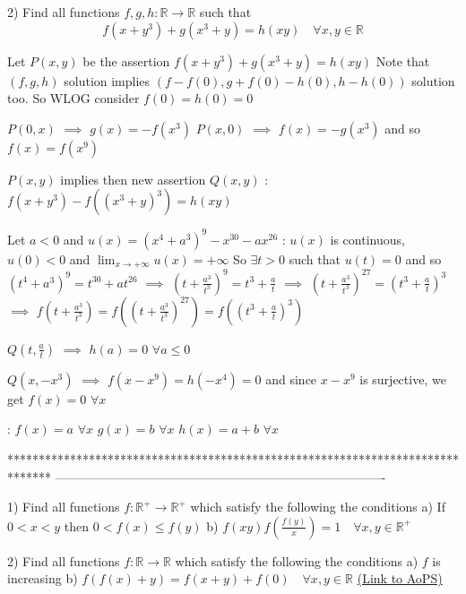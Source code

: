 \begin{solution}
	\begin{tcolorbox}2) Find all  functions $f,g,h:\mathbb{R}\to\mathbb{R}$   such that
\[f\left ( x+y^{3} \right )+g \left ( x^{3}+y \right )=h(xy) \quad \forall x,y \in \mathbb{R}\]\end{tcolorbox}
Let $P(x,y)$ be the assertion $f(x+y^3)+g(x^3+y)=h(xy)$
Note that $(f,g,h)$ solution implies $(f-f(0),g+f(0)-h(0), h-h(0))$ solution too. So WLOG consider $f(0)=h(0)=0$

$P(0,x)$ $\implies$ $g(x)=-f(x^3)$
$P(x,0)$ $\implies$ $f(x)=-g(x^3)$ and so $f(x)=f(x^9)$

$P(x,y)$ implies then new assertion $Q(x,y)$ : $f(x+y^3)-f((x^3+y)^3)=h(xy)$

Let $a<0$ and $u(x)=(x^4+a^3)^9-x^{30}-ax^{26}$ : $u(x)$ is continuous, $u(0)<0$ and $\lim_{x\to+\infty}u(x)=+\infty$
So $\exists t>0$ such that $u(t)=0$ and so $(t^4+a^3)^9=t^{30}+at^{26}$
$\implies$ $(t+\frac{a^3}{t^3})^9=t^{3}+\frac at$
$\implies$ $(t+\frac{a^3}{t^3})^{27}=(t^{3}+\frac at)^3$
$\implies$ $f(t+\frac{a^3}{t^3})=f((t+\frac{a^3}{t^3})^{27})=f((t^{3}+\frac at)^3)$

$Q(t,\frac at)$ $\implies$ $h(a)=0$ $\forall a\le 0$

$Q(x,-x^3)$ $\implies$ $f(x-x^9)=h(-x^4)=0$ and since $x-x^9$ is surjective, we get $f(x)=0$ $\forall x$

 :
$f(x)=a$ $\forall x$
$g(x)=b$ $\forall x$
$h(x)=a+b$ $\forall x$
\end{solution}
*******************************************************************************
-------------------------------------------------------------------------------

\begin{problem}
	1) Find all  functions $f:\mathbb{R}^+\to\mathbb{R}^+$  which satisfy the following the conditions
a) If $0<x<y$ then $0<f(x)\leq f(y)$
b) $f(xy)f\left ( \frac{f(y)}{x} \right )=1 \quad \forall x,y \in \mathbb{R}^+$



2) Find all  functions $f:\mathbb{R}\to\mathbb{R}$  which satisfy the following the conditions
a) $f$ is increasing
b) $f(f(x)+y)=f(x+y)+f(0)  \quad \forall x,y \in \mathbb{R}$
	\flushright \href{https://artofproblemsolving.com/community/c6h563288}{(Link to AoPS)}
\end{problem}



